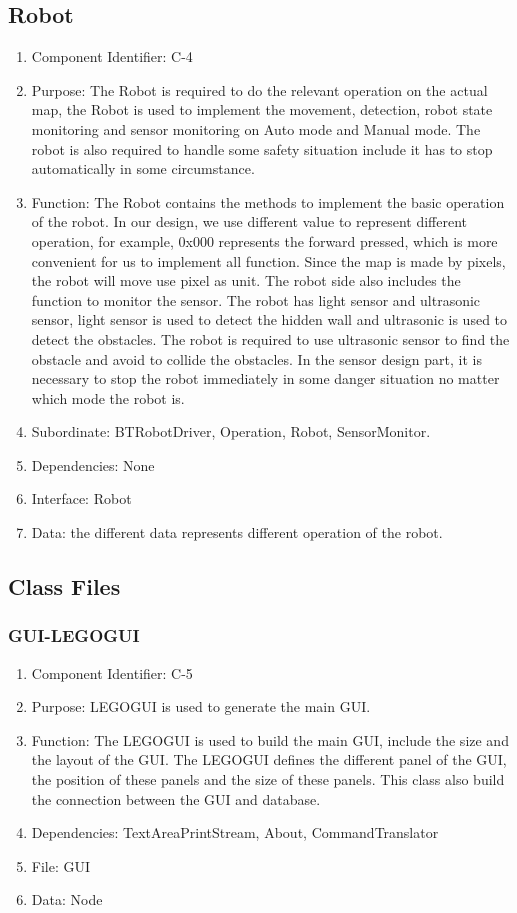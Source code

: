 \documentclass[11pt, a4paper]{report}
\begin{document}
\subsection{Robot}
\begin{enumerate}
\item Component Identifier: C-4
\item Purpose: The Robot is required to do the relevant operation on the actual map, the Robot is used to implement the movement, detection, robot state monitoring and sensor monitoring on Auto mode and Manual mode. The robot is also required to handle some safety situation include it has to stop automatically in some circumstance. 
\item Function: The Robot contains the methods to implement the basic operation of the robot. In our design, we use different value to represent different operation, for example, 0x000 represents the forward pressed, which is more convenient for us to implement all function. Since the map is made by pixels, the robot will move use pixel as unit. The robot side also includes the function to monitor the sensor. The robot has light sensor and ultrasonic sensor, light sensor is used to detect the hidden wall and ultrasonic is used to detect the obstacles. The robot is required to use ultrasonic sensor to find the obstacle and avoid to collide the obstacles. In the sensor design part, it is necessary to stop the robot immediately in some danger situation no matter which mode the robot is.      
\item Subordinate: BTRobotDriver, Operation, Robot, SensorMonitor.
\item Dependencies: None
\item Interface: Robot 
\item Data: the different data represents different operation of the robot.  
\end{enumerate}

\subsection{Class Files}
\subsubsection{GUI-LEGOGUI}
\begin{enumerate}
\item Component Identifier: C-5
\item Purpose: LEGOGUI is used to generate the main GUI. 
\item Function: The LEGOGUI is used to build the main GUI, include the size and the layout of the GUI. The LEGOGUI defines the different panel of the GUI, the position of these panels and the size of these panels. This class also build the connection between the GUI and database.
\item Dependencies: TextAreaPrintStream, About, CommandTranslator
\item File: GUI
\item Data: Node
\end{enumerate}
\end{document}
